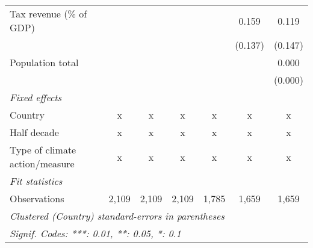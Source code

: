 \begin{tabular}{lcccccc}
   Tax revenue (\% of GDP)                                       &         &         &         &               & 0.159   & 0.119\\   
                                                                 &         &         &         &               & (0.137) & (0.147)\\   
   Population total                                              &         &         &         &               &         & 0.000\\   
                                                                 &         &         &         &               &         & (0.000)\\   
   \emph{Fixed effects}\\
   Country                                                       & x       & x       & x       & x             & x       & x\\  
   Half decade                                                   & x       & x       & x       & x             & x       & x\\  
   Type of climate action/measure                                & x       & x       & x       & x             & x       & x\\  
   \midrule \emph{Fit statistics}\\
   Observations                                                  & 2,109   & 2,109   & 2,109   & 1,785         & 1,659   & 1,659\\  
   \midrule
   \multicolumn{7}{l}{\emph{Clustered (Country) standard-errors in parentheses}}\\
   \multicolumn{7}{l}{\emph{Signif. Codes: ***: 0.01, **: 0.05, *: 0.1}}\\
\end{tabular}
\par\endgroup


